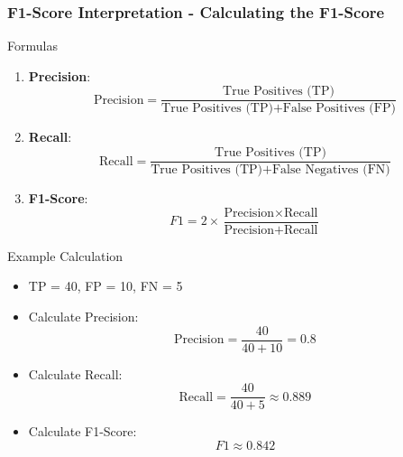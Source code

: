 \documentclass[aspectratio=169]{beamer}
\begin{document}
\begin{frame}[fragile]
    \frametitle{F1-Score Interpretation - Calculating the F1-Score}
    \begin{block}{Formulas}
        \begin{enumerate}
            \item \textbf{Precision}:
            \begin{equation}
                \text{Precision} = \frac{\text{True Positives (TP)}}{\text{True Positives (TP)} + \text{False Positives (FP)}}
            \end{equation}

            \item \textbf{Recall}:
            \begin{equation}
                \text{Recall} = \frac{\text{True Positives (TP)}}{\text{True Positives (TP)} + \text{False Negatives (FN)}}
            \end{equation}

            \item \textbf{F1-Score}:
            \begin{equation}
                F1 = 2 \times \frac{\text{Precision} \times \text{Recall}}{\text{Precision} + \text{Recall}}
            \end{equation}
        \end{enumerate}
    \end{block}
    
    \begin{block}{Example Calculation}
        \begin{itemize}
            \item TP = 40, FP = 10, FN = 5
            \item Calculate Precision: 
            \[
            \text{Precision} = \frac{40}{40 + 10} = 0.8
            \]
            \item Calculate Recall:
            \[
            \text{Recall} = \frac{40}{40 + 5} \approx 0.889
            \]
            \item Calculate F1-Score:
            \[
            F1 \approx 0.842
            \]
        \end{itemize}
    \end{block}
\end{frame}
\end{document}
